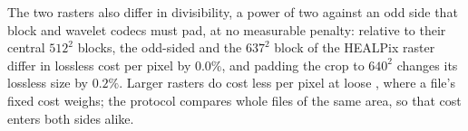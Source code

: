 The two rasters also differ in divisibility, a power of two against an
odd side that block and wavelet codecs must pad, at no measurable
penalty: relative to their central $512^2$ blocks, the odd-sided
 and the $637^2$ block of the HEALPix raster differ in
lossless cost per pixel by $0.0\%$, and padding the crop to $640^2$
changes its lossless size by $0.2\%$. Larger rasters do cost less per
pixel at loose , where a file's fixed cost weighs; the
protocol compares whole files of the same area, so that cost enters
both sides alike.
